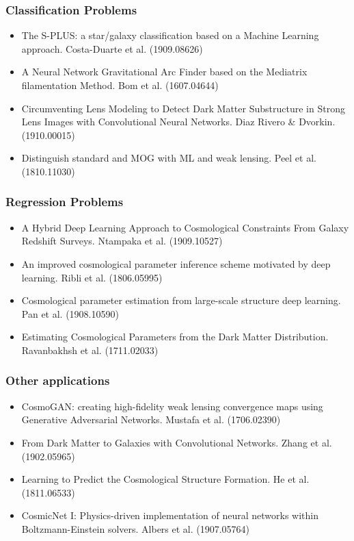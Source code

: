 \documentclass{beamer}
\begin{document}
\begin{frame}
\frametitle{Classification Problems}
\begin{itemize}
 \item The S-PLUS: a star/galaxy classification based on a Machine Learning approach. {\color{azul}Costa-Duarte et al. (1909.08626)}
 \item A Neural Network Gravitational Arc Finder based on the Mediatrix filamentation Method. {\color{azul} Bom et al.  (1607.04644)}
 \item Circumventing Lens Modeling to Detect Dark Matter Substructure in Strong Lens
Images with Convolutional Neural Networks. {\color{azul}Diaz Rivero \& Dvorkin.  (1910.00015)}
 \item Distinguish standard and MOG with ML and weak
lensing. {\color{azul}Peel et al.  (1810.11030)}
\end{itemize}
\end{frame}

\begin{frame}
 \frametitle{Regression Problems}
 \begin{itemize}
  \item A Hybrid Deep Learning Approach to Cosmological Constraints From Galaxy Redshift Surveys.{\color{azul} Ntampaka et al.  (1909.10527)}
  \item An improved cosmological parameter inference scheme motivated by deep learning. {\color{azul} Ribli et al. (1806.05995)}
  \item Cosmological parameter estimation from large-scale structure deep learning. {\color{azul} Pan et al. (1908.10590)}
  \item Estimating Cosmological Parameters from the Dark Matter Distribution. {\color{azul} Ravanbakhsh et al. (1711.02033)}
 \end{itemize}

\end{frame}

\begin{frame}
 \frametitle{Other applications}
 \begin{itemize}
  \item CosmoGAN: creating high-fidelity weak lensing convergence maps using Generative Adversarial Networks. {\color{azul} Mustafa et al.  (1706.02390)}
  \item From Dark Matter to Galaxies with Convolutional Networks. {\color{azul} Zhang et al.  (1902.05965)}
  \item Learning to Predict the Cosmological Structure Formation.{\color{azul} He et al. (1811.06533)}
  \item CosmicNet I: Physics-driven implementation of neural networks within Boltzmann-Einstein solvers. {\color{azul} Albers et al.  (1907.05764)}
 \end{itemize}

\end{frame}
\end{document}
